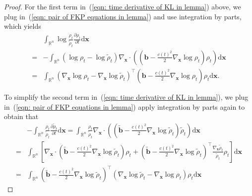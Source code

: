 \documentclass{article}
\numberwithin{equation}{section}
\def\eqref#1{(\ref{#1})}
\newcommand{\dif}{{\mathrm{d}}}
\def\vb{{\bm{b}}}
\def\vx{{\bm{x}}}
\begin{document}
\begin{proof}
    For the first term in~\eqref{eqn: time derivative of KL in lemma} above, we plug in~\eqref{eqn: pair of FKP equations in lemma} and use integration by parts, which yields
    \begin{equation}
    \label{eqn: expression of first term in lemma}
    \begin{aligned}
    &\int_{\mathbb{R}^n}\log\frac{\rho_t}{\widetilde{\rho}_t}\frac{\partial \rho_t}{\partial t}\dif\vx\\
    = &-\int_{\mathbb{R}^n}\left(\log\rho_t - \log\widetilde{\rho}_t\right)\nabla_{\vx}\cdot\left(\left(\vb - \frac{c(t)^2}{2}\nabla_{\vx}\log\rho_t\right)\rho_t\right)\dif\vx\\
    = &\int_{\mathbb{R}^n}\left(\nabla_{\vx}\log\rho_t - \nabla_{\vx}\log\widetilde{\rho}_t\right)^\intercal\left(\vb - \frac{c(t)^2}{2}\nabla_{\vx}\log\rho_t\right)\rho_t\dif\vx.
    \end{aligned}    
    \end{equation}

    To simplify the second term in~\eqref{eqn: time derivative of KL in lemma}, we plug in~\eqref{eqn: pair of FKP equations in lemma} apply integration by parts again to obtain that 
    \begin{equation}
        \label{eqn: expression of second term in lemma}
        \begin{aligned}
        &-\int_{\mathbb{R}^n}\frac{\rho_t}{\widetilde{\rho}_t}\frac{\partial \widetilde\rho_t}{\partial t}\dif\vx = \int_{\mathbb{R}^n}\frac{\rho_t}{\widetilde{\rho}_t}\nabla_{\vx}\cdot\left(\left(\widetilde{\vb} - \frac{c(t)^2}{2}\nabla_{\vx}\log\widetilde{\rho}_t\right)\widetilde{\rho}_t\right)\dif\vx\\
        = &\int_{\mathbb{R}^n}\left[\nabla_{\vx}\cdot\left(\widetilde{\vb} - \frac{c(t)^2}{2}\nabla_{\vx}\log\widetilde{\rho}_t\right)\rho_t + \left(\widetilde{\vb} - \frac{c(t)^2}{2}\nabla_{\vx}\log\widetilde{\rho}_t\right)^\intercal\frac{\nabla_{\vx}\widetilde{\rho}_t}{\widetilde{\rho}_t}\rho_t\right]\dif\vx\\
        = &\int_{\mathbb{R}^n}\left(\widetilde{\vb} - \frac{c(t)^2}{2}\nabla_{\vx}\log\widetilde{\rho}_t\right)^\intercal\left(\nabla_{\vx}\log\widetilde{\rho}_{t} - \nabla_{\vx}\log\rho_{t}\right)\rho_t\dif\vx
        \end{aligned}    
    \end{equation}


\end{proof}
\end{document}
